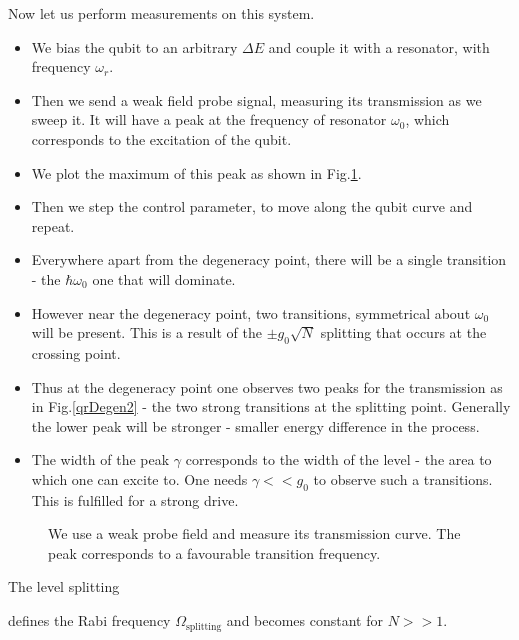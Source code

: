 Now let us perform measurements on this system.

\begin{itemize}
\item We bias the qubit to an  arbitrary $ \Delta E $ and couple
  it with a resonator, with frequency $ \omega_r $.
\item Then we send a weak field probe signal, measuring its
  transmission as we  sweep it. It will have a  peak at the
  frequency of resonator $ \omega_0  $, which corresponds to the
  excitation of the qubit.
\item  We  plot  the  maximum  of this  peak  as  shown  in
  Fig.\ref{qrProbe}.
\item Then we step the control parameter, to move along the
  qubit curve and repeat.
\item  Everywhere apart  from the  degeneracy point,  there
  will be a  single transition - the $  \hbar\omega_0 $ one
  that will dominate.
\item However  near the degeneracy point,  two transitions,
  symmetrical about $ \omega_0 $  will be present.  This is
  a result of the $ \pm g_0\sqrt{N} $ splitting that occurs
  at the crossing point.
\item Thus at  the degeneracy point one  observes two peaks
  for the  transmission as in Fig.\ref{qrDegen2}  - the two
  strong transitions at the  splitting point. Generally the
  lower peak  will be stronger -  smaller energy difference
  in the process.
\item The width of the peak  $ \gamma $ corresponds to the width
  of the level - the area  to which one can excite to.  One
  needs $ \gamma<<g_0 $ to  observe such a transitions.  This is
  fulfilled for a strong drive.
\end{itemize}

\begin{figure}
  \caption{We  use  a  weak  probe field  and  measure  its
    transmission   curve.   The   peak  corresponds   to  a
    favourable transition frequency. \label{qrProbe}}
\end{figure}

{\LARGE The level splitting
	
	
  \noindent      defines       the      Rabi      frequency
  $ \Omega_\text{splitting} $ and becomes constant for $N>>1$.}

